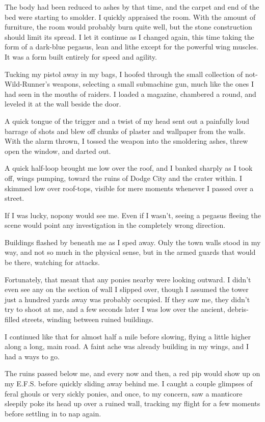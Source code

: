 The body had been reduced to ashes by that time, and the carpet and end of the bed were starting to smolder. I quickly appraised the room. With the amount of furniture, the room would probably burn quite well, but the stone construction should limit its spread. I let it continue as I changed again, this time taking the form of a dark-blue pegasus, lean and lithe except for the powerful wing muscles. It was a form built entirely for speed and agility.

Tucking my pistol away in my bags, I hoofed through the small collection of not-Wild-Runner’s weapons, selecting a small submachine gun, much like the ones I had seen in the mouths of raiders. I loaded a magazine, chambered a round, and leveled it at the wall beside the door.

A quick tongue of the trigger and a twist of my head sent out a painfully loud barrage of shots and blew off chunks of plaster and wallpaper from the walls. With the alarm thrown, I tossed the weapon into the smoldering ashes, threw open the window, and darted out.

A quick half-loop brought me low over the roof, and I banked sharply as I took off, wings pumping, toward the ruins of Dodge City and the crater within. I skimmed low over roof-tops, visible for mere moments whenever I passed over a street.

If I was lucky, nopony would see me. Even if I wasn’t, seeing a pegasus fleeing the scene would point any investigation in the completely wrong direction.

Buildings flashed by beneath me as I sped away. Only the town walls stood in my way, and not so much in the physical sense, but in the armed guards that would be there, watching for attacks.

Fortunately, that meant that any ponies nearby were looking outward. I didn’t even see any on the section of wall I slipped over, though I assumed the tower just a hundred yards away was probably occupied. If they saw me, they didn’t try to shoot at me, and a few seconds later I was low over the ancient, debris-filled streets, winding between ruined buildings.

I continued like that for almost half a mile before slowing, flying a little higher along a long, main road. A faint ache was already building in my wings, and I had a ways to go.

The ruins passed below me, and every now and then, a red pip would show up on my E.F.S. before quickly sliding away behind me. I caught a couple glimpses of feral ghouls or very sickly ponies, and once, to my concern, saw a manticore sleepily poke its head up over a ruined wall, tracking my flight for a few moments before settling in to nap again.

